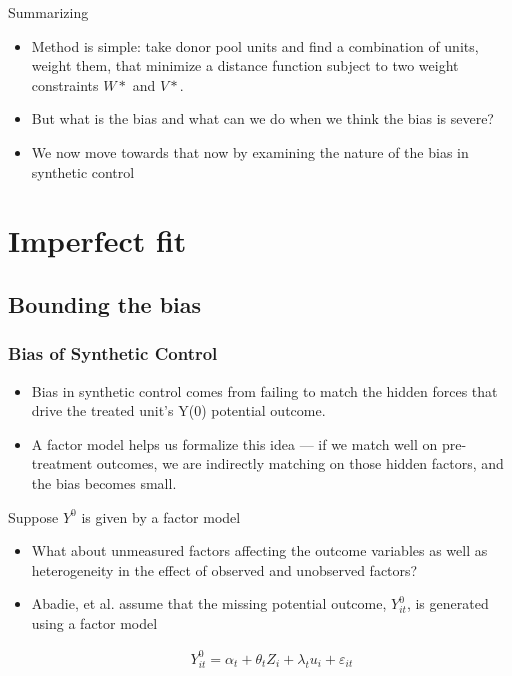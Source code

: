\documentclass{beamer}
\begin{document}
\begin{frame}{Summarizing}

\begin{itemize}

\item Method is simple: take donor pool units and find a combination of units, weight them, that minimize a distance function subject to two weight constraints $W*$ and $V*$.
\item But what is the bias and what can we do when we think the bias is severe?
\item We now move towards that now by examining the nature of the bias in synthetic control
\end{itemize}

\end{frame}

\section{Imperfect fit}

\subsection{Bounding the bias}

\begin{frame}
\frametitle{Bias of Synthetic Control}

\begin{itemize}
\item Bias in synthetic control comes from failing to match the hidden forces that drive the treated unit's Y(0) potential outcome. 
\item A factor model helps us formalize this idea — if we match well on pre-treatment outcomes, we are indirectly matching on those hidden factors, and the bias becomes small.
\end{itemize}
\end{frame}

\begin{frame}{Suppose $Y^0$ is given by a factor model}


\begin{itemize}
\item What about unmeasured factors affecting the outcome variables as well as heterogeneity in the effect of observed and unobserved factors?

\item Abadie, et al. assume that the missing potential outcome, $Y^0_{it}$, is generated using a factor model

\begin{eqnarray*}
Y_{it}^0 = \alpha_t + \theta_t Z_i + \lambda_t u_i + \varepsilon_{it}
\end{eqnarray*}


\end{itemize}

\end{frame}
\end{document}
